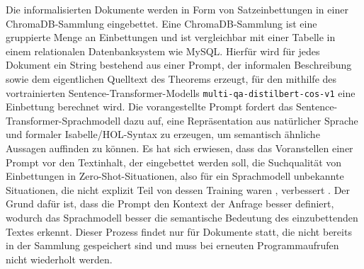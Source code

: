 \documentclass[12pt,letterpaper]{article} %
\begin{document}
Die informalisierten Dokumente werden in Form von Satzeinbettungen in einer ChromaDB-Sammlung eingebettet.
Eine ChromaDB-Sammlung ist eine gruppierte Menge an Einbettungen und ist vergleichbar mit einer Tabelle in einem relationalen Datenbanksystem wie MySQL.
Hierfür wird für jedes Dokument ein String bestehend aus einer Prompt, der informalen Beschreibung sowie dem eigentlichen Quelltext des Theorems erzeugt, für den mithilfe des vortrainierten Sentence-Transformer-Modells \texttt{multi-qa-distilbert-cos-v1} eine Einbettung berechnet wird.
Die vorangestellte Prompt fordert das Sentence-Transformer-Sprachmodell dazu auf, eine Repräsentation aus natürlicher Sprache und formaler Isabelle/HOL-Syntax zu erzeugen, um semantisch ähnliche Aussagen auffinden zu können.
Es hat sich erwiesen, dass das Voranstellen einer Prompt vor den Textinhalt, der eingebettet werden soll, die Suchqualität von Einbettungen in Zero-Shot-Situationen, also für ein Sprachmodell unbekannte Situationen, die nicht explizit Teil von dessen Training waren \citep[S. 1]{wang_zero_shot_2019}, verbessert \citep{su_one_nodate}.
Der Grund dafür ist, dass die Prompt den Kontext der Anfrage besser definiert, wodurch das Sprachmodell besser die semantische Bedeutung des einzubettenden Textes erkennt.
Dieser Prozess findet nur für Dokumente statt, die nicht bereits in der Sammlung gespeichert sind und muss bei erneuten Programmaufrufen nicht wiederholt werden.
\end{document}
